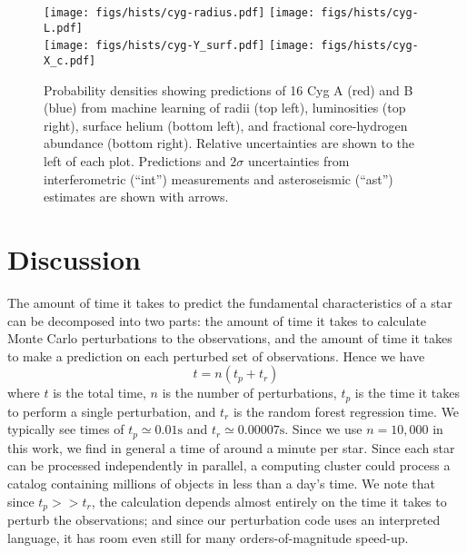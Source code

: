 \documentclass[manuscript]{aastex}
\begin{document}
\begin{figure*}
    \centering
    \texttt{[image: figs/hists/cyg-radius.pdf]}\hfill
    \texttt{[image: figs/hists/cyg-L.pdf]}\\
    \texttt{[image: figs/hists/cyg-Y\_surf.pdf]}\hfill
    \texttt{[image: figs/hists/cyg-X\_c.pdf]}\\
    \caption{Probability densities showing predictions of 16 Cyg A (red) and B (blue) from machine learning of radii (top left), luminosities (top right), surface helium (bottom left), and fractional core-hydrogen abundance (bottom right). Relative uncertainties are shown to the left of each plot. Predictions and $2\sigma$ uncertainties from interferometric (``int'') measurements and asteroseismic (``ast'') estimates are shown with arrows.}
    \label{fig:interferometry}
\end{figure*}


\section{Discussion}
The amount of time it takes to predict the fundamental characteristics of a star can be decomposed into two parts: the amount of time it takes to calculate Monte Carlo perturbations to the observations, and the amount of time it takes to make a prediction on each perturbed set of observations. Hence we have
\begin{equation}
    t = n(t_p + t_r)
\end{equation}
where $t$ is the total time, $n$ is the number of perturbations, $t_p$ is the time it takes to perform a single perturbation, and $t_r$ is the random forest regression time. We typically see times of $t_p \simeq 0.01 \si{\s}$ and $t_r \simeq 0.00007 \si{\s}$. Since we use $n=10,000$ in this work, we find in general a time of around a minute per star. Since each star can be processed independently in parallel, a computing cluster could process a catalog containing millions of objects in less than a day's time. We note that since $t_p >> t_r$, the calculation depends almost entirely on the time it takes to perturb the observations; and since our perturbation code uses an interpreted language, it has room even still for many orders-of-magnitude speed-up. 
\end{document}
